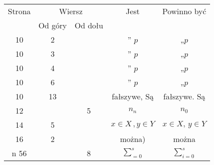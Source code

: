 \documentclass[a4paper,11pt]{article}
\begin{document}
\begin{center}

  \begin{tabular}{|c|c|c|c|c|}
    \hline
    Strona & \multicolumn{2}{c|}{Wiersz} & Jest
                              & Powinno być \\ \cline{2-3}
    & Od góry & Od dołu & & \\
    \hline
    10  &  2 & & ” $p$ & „$p$ \\
    10  &  3 & & ” $p$ & „$p$ \\
    10  &  4 & & ” $p$ & „$p$ \\
    10  &  6 & & ” $p$ & „$p$ \\
    10  & 13 & & fałszywe, Są & fałszywe. Są \\
    12  & &  5 & $n_{ n }$ & $n_{ 0 }$ \\
    14  &  5 & & $x \in X \, , y \in Y$ & $x \in X, \, y \in Y$ \\
    16  &  2 & & można) & można \\n
    56  & &  8 & $\displaystyle \sum_{ = 0 }^{ s }$
& $\displaystyle \sum_{ i = 0 }^{ s }$ \\
    \hline
  \end{tabular}

\end{center}

\vspace{\spaceTwo}















{}






\end{document}

